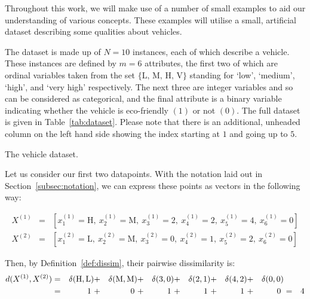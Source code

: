 \begin{example}\label{ex:dissim}
    Throughout this work, we will make use of a number of small examples to aid
    our understanding of various concepts. These examples will utilise a small,
    artificial dataset describing some qualities about vehicles.
    
    The dataset is made up of \(N = 10\) instances, each of which describe a
    vehicle. These instances are defined by \(m = 6\) attributes, the first two
    of which are ordinal variables taken from the set \(\{\text{L, M, H, V}\}\)
    standing for `low', `medium', `high', and `very high' respectively. The
    next three are integer variables and so can be considered as categorical,
    and the final attribute is a binary variable indicating whether the vehicle
    is eco-friendly \((1)\) or not \((0)\). The full dataset is given in
    Table~\ref{tab:dataset}. Please note that there is an additional, unheaded
    column on the left hand side showing the index starting at \(1\) and going
    up to \(5\).
    
    \begin{table}[H]
        \centering
        \singlespacing{%
        \resizebox{.8\textwidth}{!}{%
            \centering
            
        }}
        \caption{The vehicle dataset.}\label{tab:dataset}
    \end{table}

    Let us consider our first two datapoints. With the notation laid out in
    Section~\ref{subsec:notation}, we can express these points as vectors in the
    following way:

    \begin{equation}
        \nonumber
        \begin{aligned}
            X^{(1)} & = & \left[ x_1^{(1)} = \text{H}, \ x_2^{(1)} = \text{M}, \
            x_3^{(1)} = 2, \ x_4^{(1)} = 2, \ x_5^{(1)} = 4, \ x_6^{(1)} = 0 
            \right]
            \\
            X^{(2)} & = & \left[ x_1^{(2)} = \text{L}, \ x_2^{(2)} = \text{M}, \
            x_3^{(2)} = 0, \ x_4^{(2)} = 1, \ x_5^{(2)} = 2, \ x_6^{(2)} = 0
            \right]
        \end{aligned}
    \end{equation}

    Then, by Definition~\ref{def:dissim}, their pairwise dissimilarity is:
    \begin{equation}
        \nonumber
        \begin{aligned}
            \centering
            d(X^{(1)}, X^{(2)}) & = & \delta(\text{H}, \text{L}) & + & 
            \delta(\text{M}, \text{M}) & + & \delta(3, 0) & + & \delta(2, 1) &
            + & \delta(4, 2) & + & \delta(0, 0) & {} & {}
            \\
            {} & = & 1 \ & + & 0 \ & + & 1 \ & + & 1 \ & + & 1 \ & + & 0 \ & = &
            4
        \end{aligned}
    \end{equation}
\end{example}
